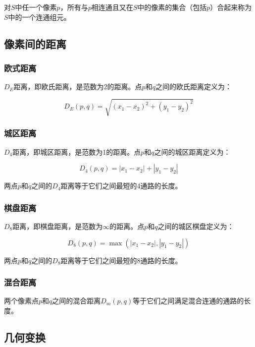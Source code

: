 \documentclass[cn, blue, normal, 12pt]{elegantnote}
\begin{document}
对$S$中任一个像素$p$，所有与$p$相连通且又在$S$中的像素的集合（包括$p$）合起来称为$S$中的一个连通组元。

\subsection{像素间的距离}

\subsubsection{欧式距离}

$D_E$距离，即欧氏距离，是范数为2的距离。点$p$和$q$之间的欧氏距离定义为：

\begin{equation}
    D_E(p,q)=\sqrt{(x_1-x_2)^2+(y_1-y_2)^2}
\end{equation}

\subsubsection{城区距离}

$D_4$距离，即城区距离，是范数为1的距离。点$p$和$q$之间的城区距离定义为：

\begin{equation}
    D_4(p,q)=|x_1-x_2|+|y_1-y_2|
\end{equation}

两点$p$和$q$之间的$D_4$距离等于它们之间最短的4通路的长度。

\subsubsection{棋盘距离}

$D_8$距离，即棋盘距离，是范数为$\infty$的距离。点$p$和$q$之间的城区棋盘定义为：

\begin{equation}
    D_8(p,q)=\max(|x_1-x_2|,|y_1-y_2|)
\end{equation}

两点$p$和$q$之间的$D_8$距离等于它们之间最短的8通路的长度。

\subsubsection{混合距离}

两个像素点$p$和$q$之间的混合距离$D_m(p,q)$等于它们之间满足混合连通的通路的长度。

\subsection{几何变换}
\end{document}
